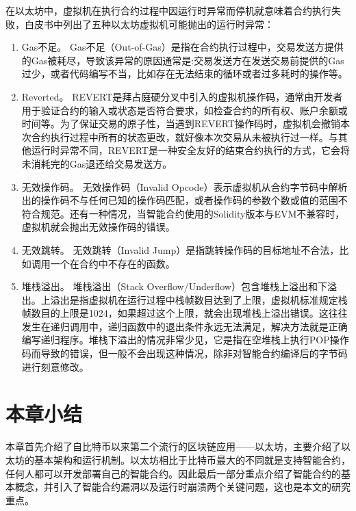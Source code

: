 在以太坊中，虚拟机在执行合约过程中因运行时异常而停机就意味着合约执行失败，白皮书中列出了五种以太坊虚拟机可能抛出的运行时异常：
\begin{enumerate}[label=(\arabic*)]
    \item Gas不足。
    Gas不足（Out-of-Gas）是指在合约执行过程中，交易发送方提供的Gas被耗尽，导致该异常的原因通常是:交易发送方在发送交易前提供的Gas过少，或者代码编写不当，比如存在无法结束的循环或者过多耗时的操作等。
    \item Reverted。
    REVERT是拜占庭硬分叉中引入的虚拟机操作码，通常由开发者用于验证合约的输入或状态是否符合要求，如检查合约的所有权、账户余额或时间等。为了保证交易的原子性，当遇到REVERT操作码时，虚拟机会撤销本次合约执行过程中所有的状态更改，就好像本次交易从未被执行过一样。与其他运行时异常不同，REVERT是一种安全友好的结束合约执行的方式，它会将未消耗完的Gas退还给交易发送方。
    \item 无效操作码。
    无效操作码（Invalid Opcode）表示虚拟机从合约字节码中解析出的操作码不与任何已知的操作码匹配，或者操作码的参数个数或值的范围不符合规范。还有一种情况，当智能合约使用的Solidity版本与EVM不兼容时，虚拟机就会抛出无效操作码的错误。
    \item 无效跳转。
    无效跳转（Invalid Jump）是指跳转操作码的目标地址不合法，比如调用一个在合约中不存在的函数。
    \item 堆栈溢出。
    堆栈溢出（Stack Overflow/Underflow）包含堆栈上溢出和下溢出。上溢出是指虚拟机在运行过程中栈帧数目达到了上限，虚拟机标准规定栈帧数目的上限是1024，如果超过这个上限，就会出现堆栈上溢出错误。这往往发生在递归调用中，递归函数中的退出条件永远无法满足，解决方法就是正确编写递归程序。堆栈下溢出的情况非常少见，它是指在空堆栈上执行POP操作码而导致的错误，但一般不会出现这种情况，除非对智能合约编译后的字节码进行刻意修改。
\end{enumerate}
\section{本章小结}
\label{sec:本章小结2}
本章首先介绍了自比特币以来第二个流行的区块链应用——以太坊，主要介绍了以太坊的基本架构和运行机制。以太坊相比于比特币最大的不同就是支持智能合约，任何人都可以开发部署自己的智能合约。因此最后一部分重点介绍了智能合约的基本概念，并引入了智能合约漏洞以及运行时崩溃两个关键问题，这也是本文的研究重点。